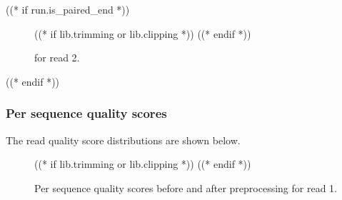 ((* if run.is_paired_end *))
    \begin{figure}[h!]
        \centering
        \begin{minipage}[b]{0.48\textwidth}
            \centering
        \end{minipage}
        \begin{minipage}[b]{0.48\textwidth}
            \centering
            ((* if lib.trimming or lib.clipping *))
            ((* endif *))
        \end{minipage}
        \caption{\capBaseQ for read 2.}
    \end{figure}
((* endif *))

\subsubsection{Per sequence quality scores}
\newcommand{\capSeqQ}{Per sequence quality scores before and after preprocessing }
    The read quality score distributions are shown below.
    \begin{figure}[h!]
        \centering
        \begin{minipage}[b]{0.48\textwidth}
            \centering
        \end{minipage}
        \begin{minipage}[b]{0.48\textwidth}
            \centering
            ((* if lib.trimming or lib.clipping *))
            ((* endif *))
        \end{minipage}
        \caption{\capSeqQ for read 1.}
    \end{figure}

